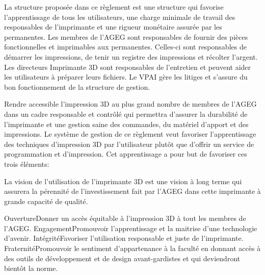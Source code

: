 

La structure proposée dans ce règlement est une structure qui favorise l'apprentissage de tous les utilisateurs, une charge minimale de travail des responsables de l'imprimante et une rigueur monétaire assurée par les permanentes. Les membres de l'AGEG sont responsables de fournir des pièces fonctionnelles et imprimables aux permanentes. Celles-ci sont responsables de démarrer les impressions, de tenir un registre des impressions et récolter l'argent. Les directeurs Imprimante 3D sont responsables de l'entretien et peuvent aider les utilisateurs à préparer leurs fichiers. Le VPAI gère les litiges et s'assure du bon fonctionnement de la structure de gestion.

Rendre accessible l'impression 3D au plus grand nombre de membres de l'AGEG dans un cadre responsable et contrôlé qui permettra d'assurer la durabilité de l'imprimante et une gestion saine des commandes, du matériel d'apport et des impressions. Le système de gestion de ce règlement veut favoriser l'apprentissage des techniques d'impression 3D par l'utilisateur plutôt que d'offrir un service de programmation et d'impression. Cet apprentissage a pour but de favoriser ces trois éléments:
 
La vision de l'utilisation de l'imprimante 3D est une vision à long terme qui assurera la pérennité de l'investissement fait par l'AGEG dans cette imprimante à grande capacité de qualité.

\valeurs
{Ouverture}{Donner un accès équitable à l'impression 3D à tout les membres de l'AGEG.}
{Engagement}{Promouvoir l'apprentissage et la maitrise d'une technologie d'avenir.}
{Intégrité}{Favoriser l'utilisation responsable et juste de l'imprimante.}
{Fraternité}{Promouvoir le sentiment d'appartenance à la faculté en donnant accès à des outils de développement et de design avant-gardistes et qui deviendront bientôt la norme.}

